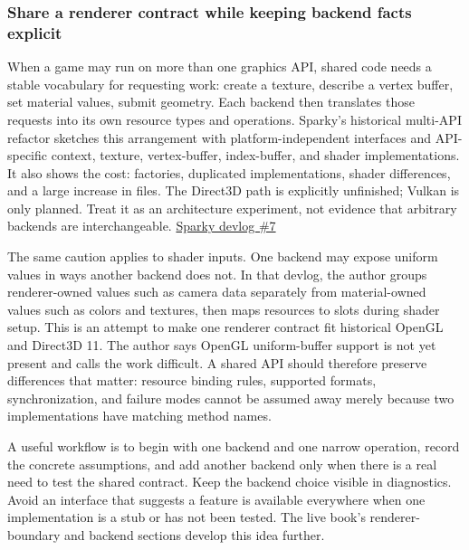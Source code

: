 \subsubsection{Share a renderer contract while keeping backend facts explicit}\label{06-engine-ii-ch025-share-a-renderer-contract-while-keeping-backend-facts-explicit}

\hypertarget{06-engine-ii-ch025-share-a-renderer-contract-while-keeping-backend-facts-explicit}{}

When a game may run on more than one graphics API, shared code needs a stable vocabulary for requesting work: create a texture, describe a vertex buffer, set material values, submit geometry. Each backend then translates those requests into its own resource types and operations. Sparky's historical multi-API refactor sketches this arrangement with platform-independent interfaces and API-specific context, texture, vertex-buffer, index-buffer, and shader implementations. It also shows the cost: factories, duplicated implementations, shader differences, and a large increase in files. The Direct3D path is explicitly unfinished; Vulkan is only planned. Treat it as an architecture experiment, not evidence that arbitrary backends are interchangeable. \href{https://www.youtube.com/watch?v=yGggmfDGGv0&t=2m43s}{Sparky devlog \#7}

The same caution applies to shader inputs. One backend may expose uniform values in ways another backend does not. In that devlog, the author groups renderer-owned values such as camera data separately from material-owned values such as colors and textures, then maps resources to slots during shader setup. This is an attempt to make one renderer contract fit historical OpenGL and Direct3D 11. The author says OpenGL uniform-buffer support is not yet present and calls the work difficult. A shared API should therefore preserve differences that matter: resource binding rules, supported formats, synchronization, and failure modes cannot be assumed away merely because two implementations have matching method names.

A useful workflow is to begin with one backend and one narrow operation, record the concrete assumptions, and add another backend only when there is a real need to test the shared contract. Keep the backend choice visible in diagnostics. Avoid an interface that suggests a feature is available everywhere when one implementation is a stub or has not been tested. The live book's renderer-boundary and backend sections develop this idea further.

